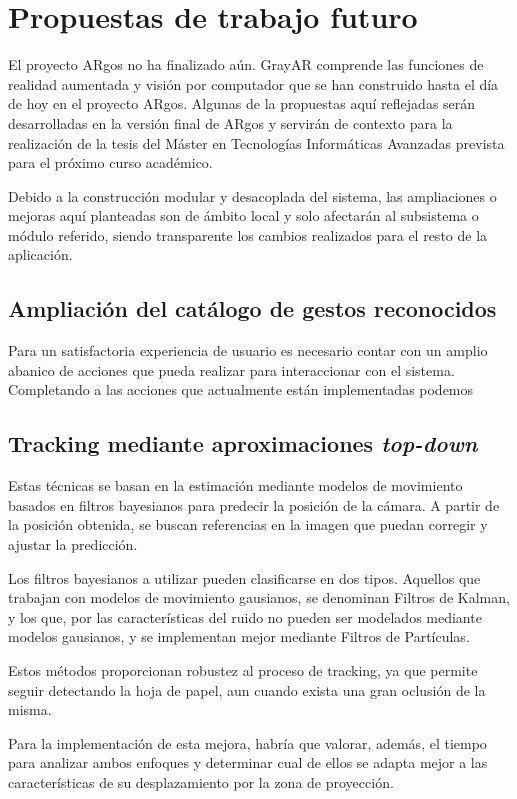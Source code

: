 \section{Propuestas de trabajo futuro}
El proyecto ARgos no ha finalizado aún. GrayAR comprende las funciones de realidad aumentada y visión por computador que se han construido hasta el día de hoy en el proyecto ARgos. Algunas de la propuestas aquí reflejadas serán desarrolladas en la versión final de ARgos y servirán de contexto para la realización de la tesis del Máster en Tecnologías Informáticas Avanzadas prevista para el próximo curso académico. 

Debido a la construcción modular y desacoplada del sistema, las ampliaciones o mejoras aquí planteadas son de ámbito local y solo afectarán al subsistema o módulo referido, siendo transparente los cambios realizados para el resto de la aplicación.

\subsection{Ampliación del catálogo de gestos reconocidos} 
Para un satisfactoria experiencia de usuario es necesario contar con un amplio abanico de acciones que pueda realizar para interaccionar con el sistema. Completando a las acciones que actualmente están implementadas podemos   

 
\subsection{Tracking mediante aproximaciones \emph{top-down}} 
Estas técnicas se basan en la estimación mediante modelos de movimiento basados en filtros bayesianos para predecir la posición de la cámara. A partir de la posición obtenida, se buscan referencias en la imagen que puedan corregir y ajustar la predicción.

Los filtros bayesianos a utilizar pueden clasificarse en dos tipos. Aquellos que trabajan con modelos de movimiento gausianos, se denominan Filtros de Kalman, y los que, por las características del ruido no pueden ser modelados mediante modelos gausianos, y se implementan mejor mediante Filtros de Partículas.

Estos métodos proporcionan robustez al proceso de tracking, ya que permite seguir detectando la hoja de papel, aun cuando exista una gran oclusión de la misma. 

Para la implementación de esta mejora, habría que valorar, además, el tiempo para analizar ambos enfoques y determinar cual de ellos se adapta mejor a las características de su desplazamiento por la zona de proyección. 

